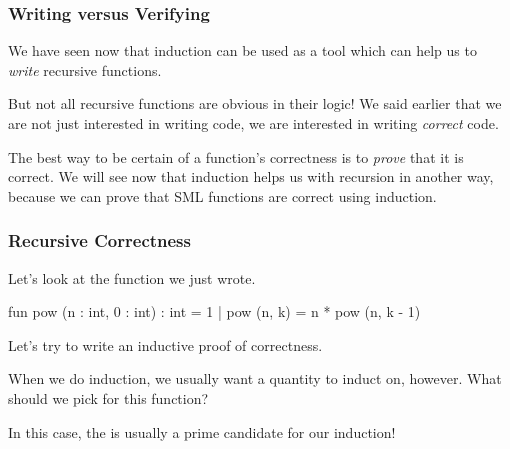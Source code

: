 \documentclass[aspectratio=169, handout]{beamer}
\begin{document}
\begin{frame}[fragile]
  \frametitle{Writing versus Verifying}

  We have seen now that induction can be used as a tool which can help us to
  \textit{write} recursive functions.

  \pause
  \vspace{\fill}

  But not all recursive functions are obvious in their logic! We said earlier
  that we are not just interested in writing code, we are interested in writing
  \textit{correct} code.

  \pause
  \vspace{\fill}

  The best way to be certain of a function's correctness is to \textit{prove}
  that it is correct. We will see now that induction helps us with recursion
  in another way, because we can prove that SML functions are correct using
  induction.

\end{frame}


\begin{frame}[fragile]
  \frametitle{Recursive Correctness}

  Let's look at the  function we just wrote.

  \vspace{\fill}

  \begin{codeblock}
    fun pow (n : int, 0 : int) : int = 1
      | pow (n, k) = n * pow (n, k - 1)
  \end{codeblock}

  \pause
  \vspace{\fill}

  Let's try to write an inductive proof of correctness.

  \pause
  \vspace{\fill}

  When we do induction, we usually want a quantity to induct on, however.
  What should we pick for this function?

  \pause
  \vspace{\fill}

  In this case, the  is usually a prime
  candidate for our induction!
\end{frame}
\end{document}
